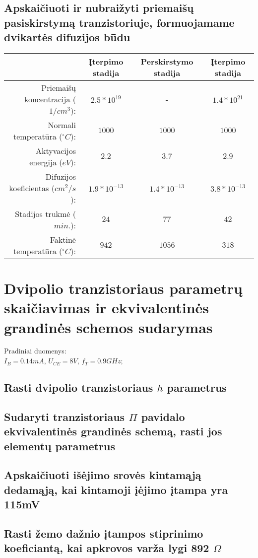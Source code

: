 \documentclass[11pt,a4paper]{article}
\begin{document}
\subsection{Apskaičiuoti ir nubraižyti priemaišų pasiskirstymą tranzistoriuje, formuojamame dvikartės difuzijos būdu}

\begin{tabular}{|r|c|c|c|}\hline
  & Įterpimo stadija & Perskirstymo stadija & Įterpimo stadija \\ \hline
  Priemaišų koncentracija ($1/cm^3$): & $2.5*10^{19}$ & - & $1.4*10^{21}$ \\ \hline
  Normali temperatūra ($^{\circ}C$): & $1000$ & $1000$ & $1000$ \\ \hline
  Aktyvacijos energija ($eV$): & $2.2$ & $3.7$ & $2.9$ \\ \hline
  Difuzijos koeficientas ($cm^2/s$): & $1.9*10^{-13}$ & $1.4*10^{-13}$ & $3.8*10^{-13}$ \\  \hline
  Stadijos trukmė ($min.$): & $24$ & $77$ & $42$ \\ \hline
  Faktinė temperatūra ($^{\circ}C$): & $942$ & $1056$ & $318$ \\ \hline
\end{tabular}




\section{Dvipolio tranzistoriaus parametrų skaičiavimas ir ekvivalentinės grandinės schemos sudarymas}
Pradiniai duomenys:\\
$I_B = 0.14 mA$, $U_{CE} = 8V$, $f_{T} = 0.9 GHz$;\\
\subsection{Rasti dvipolio tranzistoriaus $h$ parametrus}
\subsection{Sudaryti tranzistoriaus $\Pi$ pavidalo ekvivalentinės grandinės schemą, rasti jos elementų parametrus}
\subsection{Apskaičiuoti išėjimo srovės kintamąją dedamąją, kai kintamoji įėjimo įtampa yra 115mV}
\subsection{Rasti žemo dažnio įtampos stiprinimo koeficiantą, kai apkrovos varža lygi 892 $\Omega$ }
\end{document}
